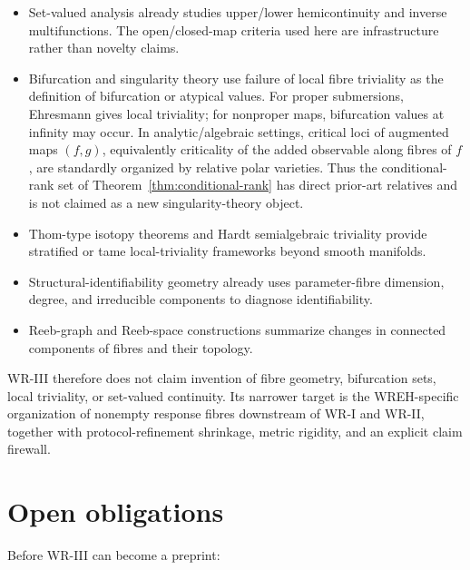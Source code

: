 \documentclass[11pt]{article}
\begin{document}
\begin{itemize}
\item Set-valued analysis already studies upper/lower hemicontinuity and
inverse multifunctions. The open/closed-map criteria used here are
infrastructure rather than novelty claims.

\item Bifurcation and singularity theory use failure of local fibre
triviality as the definition of bifurcation or atypical values. For proper
submersions, Ehresmann gives local triviality; for nonproper maps, bifurcation
values at infinity may occur. In analytic/algebraic settings, critical loci of
augmented maps \((f,g)\), equivalently criticality of the added observable
along fibres of \(f\), are standardly organized by relative polar varieties.
Thus the conditional-rank set of Theorem~\ref{thm:conditional-rank} has direct
prior-art relatives and is not claimed as a new singularity-theory object.

\item Thom-type isotopy theorems and Hardt semialgebraic triviality provide
stratified or tame local-triviality frameworks beyond smooth manifolds.

\item Structural-identifiability geometry already uses parameter-fibre
dimension, degree, and irreducible components to diagnose identifiability.

\item Reeb-graph and Reeb-space constructions summarize changes in connected
components of fibres and their topology.
\end{itemize}

WR-III therefore does not claim invention of fibre geometry, bifurcation
sets, local triviality, or set-valued continuity. Its narrower target is the
WREH-specific organization of nonempty response fibres downstream of WR-I and
WR-II, together with protocol-refinement shrinkage, metric rigidity, and an
explicit claim firewall.

\section{Open obligations}

Before WR-III can become a preprint:
\end{document}
